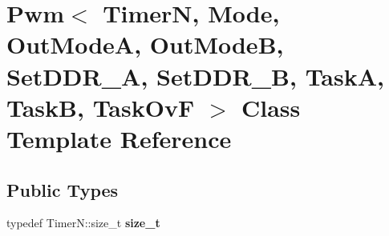 \hypertarget{classPwm}{}\section{Pwm$<$ TimerN, Mode, Out\+ModeA, Out\+ModeB, Set\+D\+D\+R\+\_\+A, Set\+D\+D\+R\+\_\+B, TaskA, TaskB, Task\+OvF $>$ Class Template Reference}
\label{classPwm}
\subsection*{Public Types}
\begin{DoxyCompactItemize}
\item 
typedef Timer\+N\+::size\+\_\+t {\bfseries size\+\_\+t}\hypertarget{classPwm_a085bea402ce3fe904e208f6c1c5e1fa3}{}\label{classPwm_a085bea402ce3fe904e208f6c1c5e1fa3}

\end{DoxyCompactItemize}
